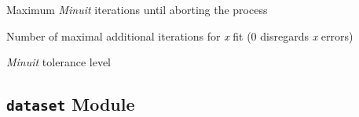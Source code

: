 \documentclass[letterpaper,10pt,english]{sphinxmanual}
\begin{document}
\begin{fulllineitems}
\label{api/kafe:kafe.constants.M_MAX_ITERATIONS}
Maximum \emph{Minuit} iterations until aborting the process

\end{fulllineitems}


\begin{fulllineitems}
\label{api/kafe:kafe.constants.M_MAX_X_FIT_ITERATIONS}
Number of maximal additional iterations for \emph{x} fit (0 disregards \emph{x} errors)

\end{fulllineitems}


\begin{fulllineitems}
\label{api/kafe:kafe.constants.M_TOLERANCE}
\emph{Minuit} tolerance level

\end{fulllineitems}



\subsection{\texttt{dataset} Module}
\label{api/kafe:dataset-module}\label{api/kafe:module-kafe.dataset}\label{api/kafe:module-dataset}
\end{document}
